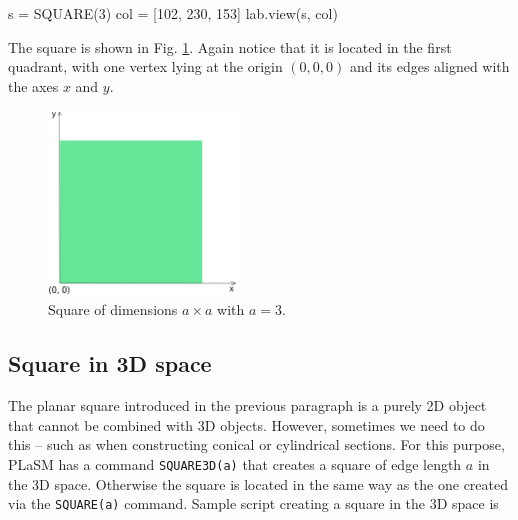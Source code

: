 \begin{bluecode}
s = SQUARE(3)
col = [102, 230, 153]
lab.view(s, col)
\end{bluecode}
The square is shown in Fig. \ref{fig:square-111}. Again notice that 
it is located in the first quadrant, with one vertex lying at 
the origin $(0, 0, 0)$ and its edges aligned with the axes $x$ and $y$.

\begin{figure}[!ht]
\begin{center}
\includegraphics[width=0.45\textwidth]{img/square-111.png}
\end{center}
\vspace{-4mm}
\caption{Square of dimensions $a \times a$ with $a = 3$.}
\label{fig:square-111}
\end{figure}
\noindent

\subsection{Square in 3D space}

The planar square introduced in the previous paragraph is a purely 
2D object that cannot be combined with 3D objects. However, sometimes
we need to do this -- such as when constructing conical or cylindrical 
sections. For this purpose, PLaSM has a command {\tt SQUARE3D(a)} that 
creates a square of edge length $a$ in the 3D space. Otherwise the 
square is located in the same way as the one created via the 
{\tt SQUARE(a)} command. Sample script creating a square in the 3D space 
is 

